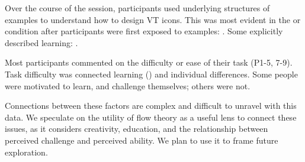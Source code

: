     Over the course of the session, participants used %
    underlying structures of examples to understand how to design VT icons. %
    This was most evident in the \none or \lo condition after participants were first  exposed to examples: 
    .
    Some %
    explicitly described learning: %
    .

    
    Most participants commented on the difficulty or ease of their task (P1-5, 7-9). Task difficulty was connected learning () and individual differences.
    Some people were motivated to learn, and challenge themselves; others were not.    
    
    Connections between these factors are complex and difficult to unravel with this data.
    We speculate on the utility of flow theory
    \cite{Csikszentmihalyi1996} as a useful lens to connect these issues, as it considers creativity, education, and the relationship between perceived challenge and perceived ability.
    We plan to use it to frame future exploration.
    
    
    
    
    
    
